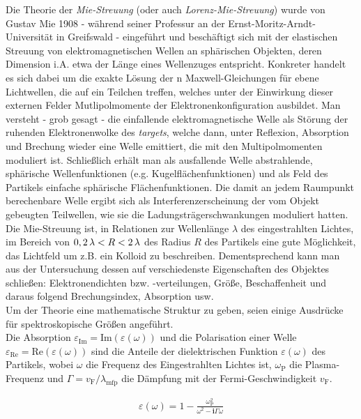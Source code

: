 \documentclass[numbers=noenddot,a4paper,notitlepage,twoside,BCOR15mm]{scrartcl}
\newcommand{\ix}[1]{_\text{#1}}
\newcommand{\imag}{\mathbf{i}}
\newcommand{\tilt}[1]{\textit{#1}}
\begin{document}
			Die Theorie der \tilt{Mie-Streuung} (oder auch \tilt{Lorenz-Mie-Streuung}) wurde von Gustav Mie 1908 - während seiner Professur an der Ernst-Moritz-Arndt-Universität in Greifswald - eingeführt und beschäftigt sich mit der elastischen Streuung von elektromagnetischen Wellen an sphärischen Objekten, deren Dimension i.A. etwa der Länge eines Wellenzuges entspricht. Konkreter handelt es sich dabei um die exakte Lösung der n Maxwell-Gleichungen für ebene Lichtwellen, die auf ein Teilchen treffen, welches unter der Einwirkung dieser externen Felder Mutlipolmomente der Elektronenkonfiguration ausbildet. Man versteht - grob gesagt - die einfallende elektromagnetische Welle als Störung der ruhenden Elektronenwolke des \tilt{targets}, welche dann, unter Reflexion, Absorption und Brechung wieder eine Welle emittiert, die mit den Multipolmomenten moduliert ist. Schließlich erhält man als ausfallende Welle abstrahlende, sphärische Wellenfunktionen (e.g. Kugelflächenfunktionen) und als Feld des Partikels einfache sphärische Flächenfunktionen. Die damit an jedem Raumpunkt berechenbare Welle ergibt sich als Interferenzerscheinung der vom Objekt gebeugten Teilwellen, wie sie die Ladungsträgerschwankungen moduliert hatten.\\
			Die Mie-Streuung ist, in Relationen zur Wellenlänge $\lambda$ des eingestrahlten Lichtes, im Bereich von $\unit[0,2]{\lambda}<R<\unit[2]{\lambda}$ des Radius $R$ des Partikels eine gute Möglichkeit, das Lichtfeld um z.B. ein Kolloid zu beschreiben. Dementsprechend kann man aus der Untersuchung dessen auf verschiedenste Eigenschaften des Objektes schließen: Elektronendichten bzw. -verteilungen, Größe, Beschaffenheit und daraus folgend Brechungsindex, Absorption usw.\\
			Um der Theorie eine mathematische Struktur zu geben, seien einige Ausdrücke für spektroskopische Größen angeführt.\\
			Die Absorption $\varepsilon\ix{Im}=\text{Im}\left(\varepsilon\left(\omega\right)\right)$ und die Polarisation einer Welle $\varepsilon\ix{Re}=\text{Re}\left(\varepsilon\left(\omega\right)\right)$ sind die Anteile der dielektrischen Funktion $\varepsilon\left(\omega\right)$ des Partikels, wobei $\omega$ die Frequenz des Eingestrahlten Lichtes ist, $\omega\ix{P}$ die Plasma-Frequenz und $\Gamma=v\ix{F}/\lambda\ix{mfp}$ die Dämpfung mit der Fermi-Geschwindigkeit $v\ix{F}$.
			
				\begin{align}
					\varepsilon\left(\omega\right)=1-\frac{\omega\ix{P}^2}{\omega^2-\imag\Gamma\omega}
				\end{align}
\end{document}
